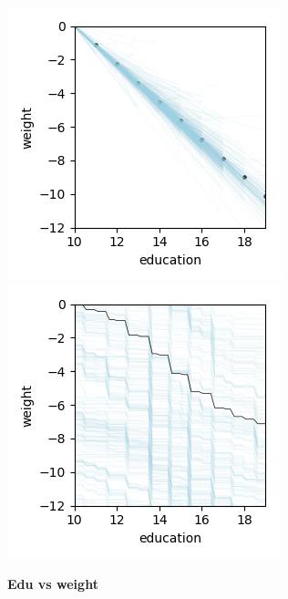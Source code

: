 \documentclass[12pt]{article}
\begin{document}
\begin{figure}[htbp]
\begin{center}
\includegraphics[scale=0.7]{images/education_vs_weight_stratpd.png}
\includegraphics[scale=0.7]{images/education_vs_weight_pdp.png}
\caption{{\bf  Edu vs weight}}
\label{fig:education_vs_weight}
\end{center}
\end{figure}
\end{document}
